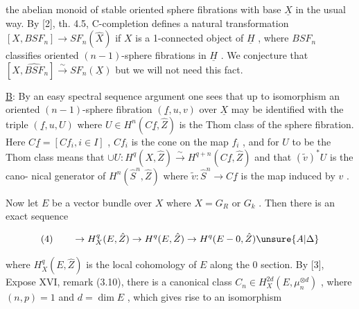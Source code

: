 
the abelian monoid of stable oriented sphere fibrations with base
$\underline{X}$ in the usual way. By [2], th. 4.5, C-completion defines a
natural transformation $[X,BSF_n] \to SF_n(\hat{X})$ if $X$ is a 1-connected
object of $\underline{H}$ , where $BSF_n$ classifies oriented $(n - 1)$-sphere
fibrations in $\underline{H}$ . We conjecture that $[X,\widehat{BSF}_n] \xrightarrow{\sim} SF_n(\underline{X})$ but we
will not need this fact.

\uline{B}: By an easy spectral sequence argument one sees that up to
isomorphism an oriented $(n - 1)$-sphere fibration $(\underline{f},u,v)$ over $\underline{X}$
may be identified with the triple $(\underline{f},u,U)$ where $U \in H^n(C\underline{f},\hat{Z})$ is
the Thom class of the sphere fibration. Here $C\underline{f} = [Cf_i, i \in I]$ ,
$Cf_i$ is the cone on the map $f_i$ , and for $U$ to be the Thom class
means that $\cup U : H^q(X,\hat{Z}) \xrightarrow{\sim} H^{q+n}(C\underline{f},\hat{Z})$ and that $(\tilde{v})^*U$ is the cano-%
nical generator of $H^n(\hat{S}^n,\hat{Z})$ where $\tilde{v} : \hat{S}^n \to C\underline{f}$ is the map induced
by $v$ .

Now let $E$ be a vector bundle over $X$ where $X = G_R$ or $G_k$ .
Then there is an exact sequence

\[ (4) \qquad \to H^q_X(E,\hat{Z}) \to H^q(E,\hat{Z}) \to H^q(E - 0,\hat{Z}) \unsure{A|\Delta} \]

where $H^q_X(E,\hat{Z})$ is the local cohomology of $E$ along the 0 section.
By [3], Expose XVI, remark (3.10), there is a canonical class
$C_n \in H^{2d}_X(E,\mu_n^{\otimes d})$ , where $(n,p) = 1$ and $d = \dim E$ , which gives
rise to an isomorphism

